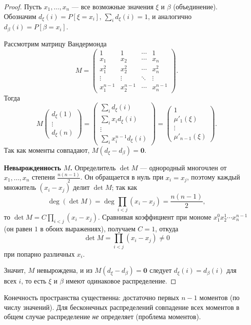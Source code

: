 \begin{proof}
	Пусть $x_1,\dots,x_n$ — все возможные значения $\xi$ и $\beta$ (объединение). Обозначим $d_\xi(i)=P[\xi=x_i]$, $\sum_i d_\xi(i)=1$, и аналогично $d_\beta(i)=P[\beta=x_i]$.

	Рассмотрим матрицу Вандермонда
	\[
	M=\begin{pmatrix}
		1 & 1 & \cdots & 1\\
		x_1 & x_2 & \cdots & x_n\\
		x_1^2 & x_2^2 & \cdots & x_n^2\\
		\vdots & \vdots & \ddots & \vdots\\
		x_1^{n-1} & x_2^{n-1} & \cdots & x_n^{n-1}
	\end{pmatrix}.
	\]
	Тогда
	\[
	M\begin{pmatrix}d_\xi(1)\\\vdots\\d_\xi(n)\end{pmatrix}
	=\begin{pmatrix}\sum_i d_\xi(i)\\\sum_i x_i d_\xi(i)\\\vdots\\\sum_i x_i^{n-1}d_\xi(i)\end{pmatrix}
	=\begin{pmatrix}1\\\mu'_1(\xi)\\\vdots\\\mu'_{n-1}(\xi)\end{pmatrix}.
	\]
	Так как моменты совпадают, $M(d_\xi-d_\beta)=\mathbf 0$.

	\textbf{Невырожденность $M$.} Определитель $\det M$ — однородный многочлен от $x_1,\dots,x_n$ степени $\tfrac{n(n-1)}{2}$. Он обращается в нуль при $x_i=x_j$, поэтому каждый множитель $(x_i-x_j)$ делит $\det M$; так как
	\[
	\deg(\det M)=\deg\prod_{i<j}(x_i-x_j)=\frac{n(n-1)}{2},
	\]
	то $\det M=C\prod_{i<j}(x_i-x_j)$. Сравнивая коэффициент при мономе $x_1^0x_2^1\cdots x_n^{n-1}$ (он равен $1$ в обоих выражениях), получаем $C=1$, откуда
	\[
	\det M=\prod_{i<j}(x_i-x_j)\ne 0
	\]
	при попарно различных $x_i$.

	Значит, $M$ невырождена, и из $M(d_\xi-d_\beta)=\mathbf 0$ следует $d_\xi(i)=d_\beta(i)$ для всех $i$, то есть $\xi$ и $\beta$ имеют одинаковое распределение.
\end{proof}

\begin{Remark}{}{}
	Конечность пространства существенна: достаточно первых $n-1$ моментов (по числу значений). Для бесконечных распределений совпадение всех моментов в общем случае распределение \emph{не} определяет (проблема моментов).
\end{Remark}
